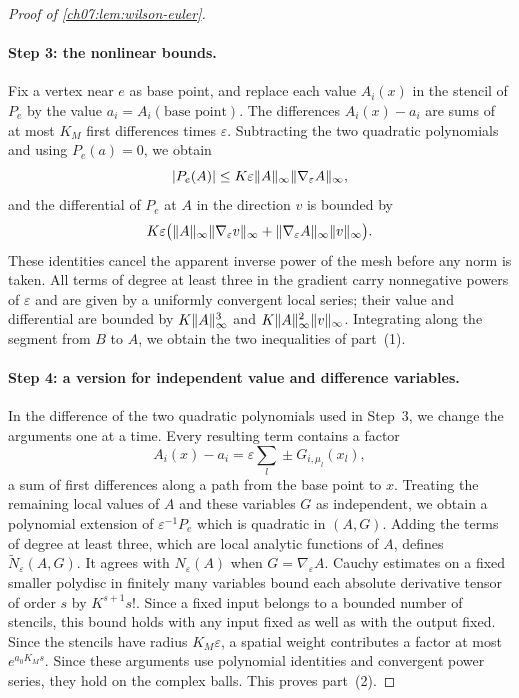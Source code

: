 \begin{proof}[Proof of \cref{ch07:lem:wilson-euler}]
\paragraph{Step 3: the nonlinear bounds.}
Fix a vertex near $e$ as base point, and replace each value $A_i(x)$ in the stencil of $P_e$ by the value $a_i=A_i(\text{base point})$. The differences $A_i(x)-a_i$ are sums of at most $K_M$ first differences times $\varepsilon$. Subtracting the two quadratic polynomials and using $P_e(a)=0$, we obtain
\[
 \lvert P_e(A)\rvert\le K\varepsilon\lVert A\rVert_\infty\lVert \nabla_\varepsilon A\rVert_\infty,
\]
and the differential of $P_e$ at $A$ in the direction $v$ is bounded by
\[
 K\varepsilon\bigl(\lVert A\rVert_\infty\lVert \nabla_\varepsilon v\rVert_\infty+\lVert \nabla_\varepsilon A\rVert_\infty\lVert v\rVert_\infty\bigr).
\]
These identities cancel the apparent inverse power of the mesh before any norm is taken. All terms of degree at least three in the gradient carry nonnegative powers of $\varepsilon$ and are given by a uniformly convergent local series; their value and differential are bounded by $K\lVert A\rVert_\infty^3$ and $K\lVert A\rVert_\infty^2\lVert v\rVert_\infty$. Integrating along the segment from $B$ to $A$, we obtain the two inequalities of part~(1).

\paragraph{Step 4: a version for independent value and difference variables.}
In the difference of the two quadratic polynomials used in Step~3, we change the arguments one at a time. Every resulting term contains a factor
\[
 A_i(x)-a_i=\varepsilon\sum_l\pm G_{i,\mu_l}(x_l),
\]
a sum of first differences along a path from the base point to $x$. Treating the remaining local values of $A$ and these variables $G$ as independent, we obtain a polynomial extension of $\varepsilon^{-1}P_e$ which is quadratic in $(A,G)$. Adding the terms of degree at least three, which are local analytic functions of $A$, defines $\widetilde N_\varepsilon(A,G)$. It agrees with $N_\varepsilon(A)$ when $G=\nabla_\varepsilon A$. Cauchy estimates on a fixed smaller polydisc in finitely many variables bound each absolute derivative tensor of order $s$ by $K^{s+1}s!$. Since a fixed input belongs to a bounded number of stencils, this bound holds with any input fixed as well as with the output fixed. Since the stencils have radius $K_M\varepsilon$, a spatial weight contributes a factor at most $e^{a_0K_Ms}$. Since these arguments use polynomial identities and convergent power series, they hold on the complex balls. This proves part~(2).


\end{proof}
